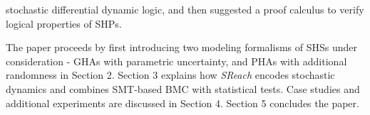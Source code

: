 stochastic differential dynamic logic, and then suggested a proof calculus to verify logical properties of SHPs. 

The paper proceeds by first introducing two modeling formalisms of SHSs under consideration - GHAs with parametric uncertainty, and PHAs with additional randomness in Section 2. Section 3 explains how {\it SReach} encodes stochastic dynamics and combines SMT-based BMC with statistical tests. Case studies and additional experiments are discussed in Section 4. Section 5 concludes the paper.

